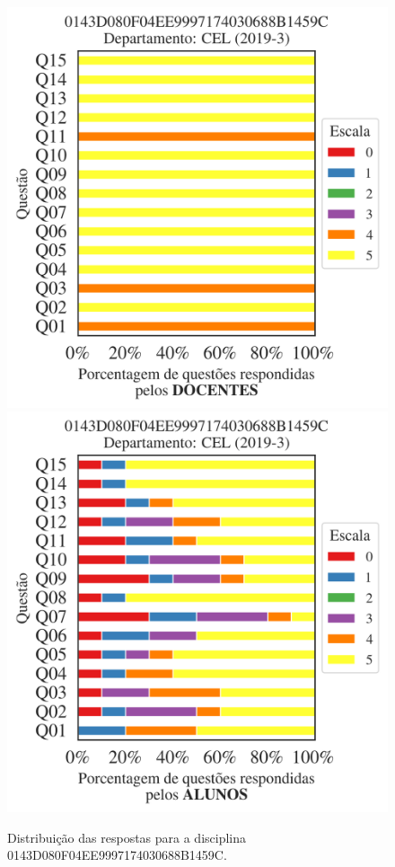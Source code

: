 \documentclass[a4paper,10pt]{article}
\begin{document}
\begin{figure}[h]
\centering
\includegraphics[width=0.485\linewidth]{analise_disciplina_departamento_CEL_0143D080F04EE9997174030688B1459C_docentes.png}
\includegraphics[width=0.485\linewidth]{analise_disciplina_departamento_CEL_0143D080F04EE9997174030688B1459C_alunos.png}
\caption{\label{fig:analise_geral_departamento}                Distribuição das respostas para a disciplina 0143D080F04EE9997174030688B1459C. }
\end{figure}
\end{document}
